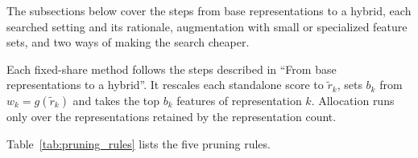 The subsections below cover the steps from base representations to a hybrid, each searched setting and its rationale, augmentation with small or specialized feature sets, and two ways of making the search cheaper.

Each fixed-share method follows the steps described in ``From base representations to a hybrid''. It rescales each standalone score to $\tilde r_k$, sets $b_k$ from $w_k = g(\tilde r_k)$ and takes the top $b_k$ features of representation $k$. Allocation runs only over the representations retained by the representation count.

Table~\ref{tab:pruning_rules} lists the five pruning rules.
